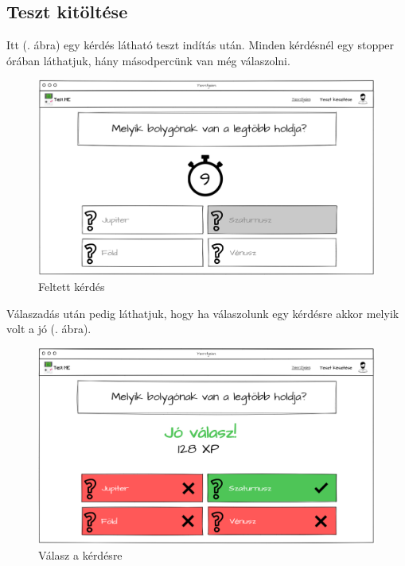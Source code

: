 \subsection{Teszt kitöltése}

Itt (. ábra) egy kérdés látható teszt indítás után. Minden kérdésnél egy stopper órában láthatjuk, hány másodpercünk van még válaszolni.

\begin{figure}[h!]
    \centering
    \includegraphics[width=\linewidth]{images/test1_wireframe.png}
    \caption{Feltett kérdés}
    \label{fig:test_question}
\end{figure}

Válaszadás után pedig láthatjuk, hogy ha válaszolunk egy kérdésre akkor melyik volt a jó (. ábra).

\begin{figure}[h!]
    \centering
    \includegraphics[width=\linewidth]{images/test2_wireframe.png}
    \caption{Válasz a kérdésre}
    \label{fig:test_answer}
\end{figure}

